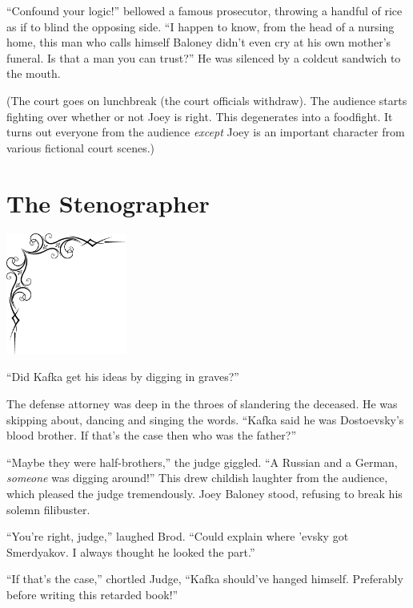 \documentclass[oneside]{book}
\begin{document}
{``Confound your logic!'' bellowed a famous prosecutor, throwing a handful of rice as if to
blind the opposing side.  ``I happen to know, from the head of a nursing home, this man who
calls himself Baloney didn't even cry at his own mother's funeral.  Is that a man you can
trust?''  He was silenced by a coldcut sandwich to the mouth.






(The court goes on lunchbreak (the court officials withdraw).  The audience starts fighting
over whether or not Joey is right.  This degenerates into a foodfight.  It turns out everyone
from the audience \emph{except} Joey is an important character from various fictional
court scenes.)
}

\chapter{The Stenographer}

\vspace{-2in}
\hspace{-.5in}
\includegraphics[width=150px]{ulcorner1.eps}

``Did Kafka get his ideas by digging in graves?''

The defense attorney was deep in the throes of slandering the
deceased.  He was skipping about,
dancing and singing the words.
``Kafka said he was Dostoevsky's blood brother.
If that's the case then who was the father?''

``Maybe they were half-brothers,'' the judge giggled.  ``A Russian and a German,
\emph{someone} was digging around!''  This drew childish laughter from the
audience, which pleased the judge tremendously.  Joey Baloney stood, refusing to
break his solemn filibuster.

``You're right, judge,'' laughed Brod.  ``Could explain where 'evsky got
Smerdyakov.  I always thought he looked the part.''

``If that's the case,'' chortled Judge, ``Kafka should've hanged himself.  Preferably
before writing this retarded book!''
\end{document}
